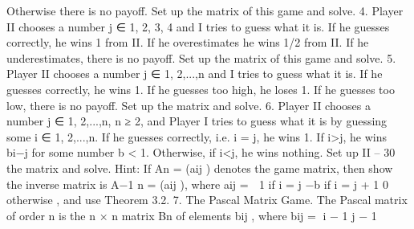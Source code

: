 Otherwise there is no payoff. Set up the matrix of this game and solve.
4. Player II chooses a number j ∈ {1, 2, 3, 4} and I tries to guess what it is. If
he guesses correctly, he wins 1 from II. If he overestimates he wins 1/2 from II. If he
underestimates, there is no payoff. Set up the matrix of this game and solve.
5. Player II chooses a number j ∈ {1, 2,...,n} and I tries to guess what it is. If he
guesses correctly, he wins 1. If he guesses too high, he loses 1. If he guesses too low, there
is no payoff. Set up the matrix and solve.
6. Player II chooses a number j ∈ {1, 2,...,n}, n ≥ 2, and Player I tries to guess
what it is by guessing some i ∈ {1, 2,...,n}. If he guesses correctly, i.e. i = j, he wins 1.
If i>j, he wins bi−j for some number b < 1. Otherwise, if i<j, he wins nothing. Set up
II – 30
the matrix and solve. Hint: If An = (aij ) denotes the game matrix, then show the inverse
matrix is A−1
n = (aij ), where aij =
 1 if i = j
−b if i = j + 1
0 otherwise
, and use Theorem 3.2.
7. The Pascal Matrix Game. The Pascal matrix of order n is the n × n matrix
Bn of elements bij , where
bij =
i − 1
j − 1

